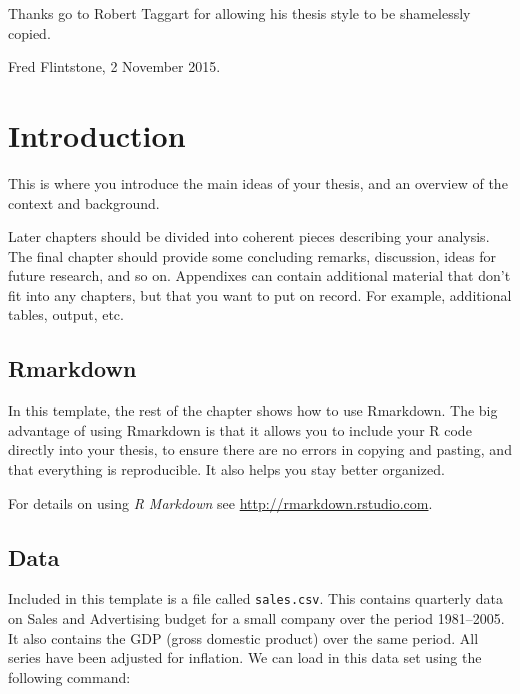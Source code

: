 \documentclass[honours,12pt,twoside]{unswthesis}
\newcommand\blankpage{%
    \null
    \thispagestyle{empty}%
    \addtocounter{page}{-1}%
    \newpage}
\numberwithin{equation}{section}
\begin{document}
\bigskip\noindent Thanks go to Robert Taggart for allowing his thesis
style to be shamelessly copied.

\bigskip\bigskip\bigskip\noindent Fred Flintstone, 2 November 2015.

\afterpage{\blankpage}


\afterpage{\blankpage}

\afterpreface

\afterpage{\blankpage}

\hypertarget{ch:intro}{%
\chapter{Introduction}\label{ch:intro}}

This is where you introduce the main ideas of your thesis, and an overview of the context and background.

Later chapters should be divided into coherent pieces describing your analysis. The final chapter should provide some concluding remarks, discussion, ideas for future research, and so on. Appendixes can contain additional material that don't fit into any chapters, but that you want to put on record. For example, additional tables, output, etc.

\hypertarget{rmarkdown}{%
\section{Rmarkdown}\label{rmarkdown}}

In this template, the rest of the chapter shows how to use Rmarkdown. The big advantage of using Rmarkdown is that it allows you to include your R code directly into your thesis, to ensure there are no errors in copying and pasting, and that everything is reproducible. It also helps you stay better organized.

For details on using \emph{R Markdown} see \url{http://rmarkdown.rstudio.com}.

\hypertarget{data}{%
\section{Data}\label{data}}

Included in this template is a file called \texttt{sales.csv}. This contains quarterly data on Sales and Advertising budget for a small company over the period 1981--2005. It also contains the GDP (gross domestic product) over the same period. All series have been adjusted for inflation. We can load in this data set using the following command:
\end{document}
